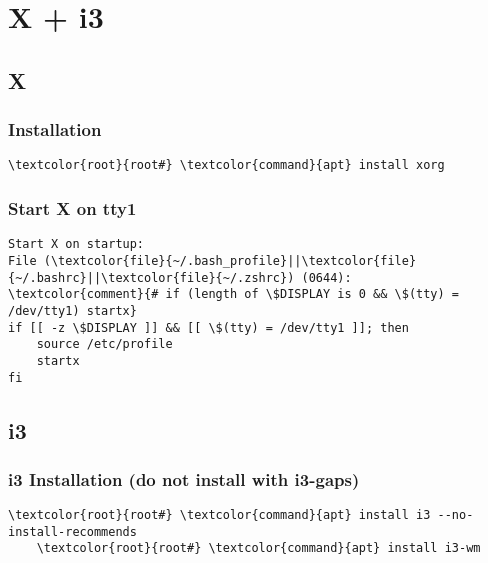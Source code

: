 \documentclass[10pt, a4paper, onecolumn, openany]{book} %
\begin{document}
\chapter{X + i3}
\section{X}
\subsection{Installation}
\begin{Verbatim}[commandchars=\\\{\}]
    \textcolor{root}{root#} \textcolor{command}{apt} install xorg
\end{Verbatim}
\subsection{Start X on tty1}
\begin{Verbatim}[commandchars=\\\{\}]
Start X on startup:
File (\textcolor{file}{~/.bash_profile}||\textcolor{file}{~/.bashrc}||\textcolor{file}{~/.zshrc}) (0644):
\textcolor{comment}{# if (length of \$DISPLAY is 0 && \$(tty) = /dev/tty1) startx}
if [[ -z \$DISPLAY ]] && [[ \$(tty) = /dev/tty1 ]]; then
    source /etc/profile
    startx
fi
\end{Verbatim}
\section{i3}
\subsection{i3 Installation (do not install with i3-gaps)}
\begin{Verbatim}[commandchars=\\\{\}]
    \textcolor{root}{root#} \textcolor{command}{apt} install i3 --no-install-recommends
    \textcolor{root}{root#} \textcolor{command}{apt} install i3-wm 
\end{Verbatim}
\end{document}
